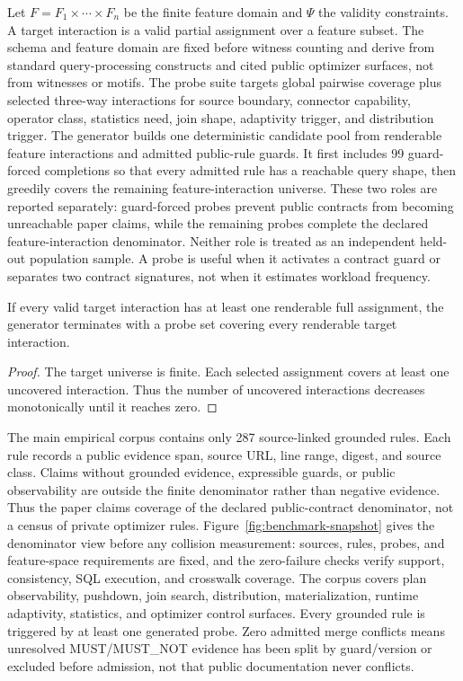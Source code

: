 Let $F=F_1\times\cdots\times F_n$ be the finite feature domain and $\Psi$ the validity constraints.  A target interaction is a valid partial assignment over a feature subset.  The schema and feature domain are fixed before witness counting and derive from standard query-processing constructs and cited public optimizer surfaces, not from witnesses or motifs.  The probe suite targets global pairwise coverage plus selected three-way interactions for source boundary, connector capability, operator class, statistics need, join shape, adaptivity trigger, and distribution trigger.  The generator builds one deterministic candidate pool from renderable feature interactions and admitted public-rule guards.  It first includes 99 guard-forced completions so that every admitted rule has a reachable query shape, then greedily covers the remaining feature-interaction universe.  These two roles are reported separately: guard-forced probes prevent public contracts from becoming unreachable paper claims, while the remaining probes complete the declared feature-interaction denominator.  Neither role is treated as an independent held-out population sample.  A probe is useful when it activates a contract guard or separates two contract signatures, not when it estimates workload frequency.

\begin{observation}[Coverage]
If every valid target interaction has at least one renderable full assignment, the generator terminates with a probe set covering every renderable target interaction.
\end{observation}
\begin{proof}
The target universe is finite.  Each selected assignment covers at least one uncovered interaction.  Thus the number of uncovered interactions decreases monotonically until it reaches zero.
\end{proof}

The main empirical corpus contains only 287 source-linked grounded rules.  Each rule records a public evidence span, source URL, line range, digest, and source class.  Claims without grounded evidence, expressible guards, or public observability are outside the finite denominator rather than negative evidence.  Thus the paper claims coverage of the declared public-contract denominator, not a census of private optimizer rules.  Figure~\ref{fig:benchmark-snapshot} gives the denominator view before any collision measurement: sources, rules, probes, and feature-space requirements are fixed, and the zero-failure checks verify support, consistency, SQL execution, and crosswalk coverage.  The corpus covers plan observability, pushdown, join search, distribution, materialization, runtime adaptivity, statistics, and optimizer control surfaces.  Every grounded rule is triggered by at least one generated probe.  Zero admitted merge conflicts means unresolved MUST/MUST\_NOT evidence has been split by guard/version or excluded before admission, not that public documentation never conflicts.

